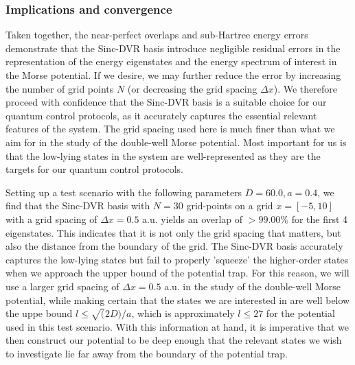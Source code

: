 \documentclass{subfiles}
\begin{document}
\subsubsection{Implications and convergence}
Taken together, the near-perfect overlaps and sub-Hartree energy errors demonstrate that the Sinc-DVR basis introduce negligible residual errors in the representation of the energy eigenstates and the energy spectrum of interest in the Morse potential. If we desire, we may further reduce the error by increasing the number of grid points $N$ (or decreasing the grid spacing $\Delta x$). We therefore proceed with confidence that the Sinc-DVR basis is a suitable choice for our quantum control protocols, as it accurately captures the essential relevant features of the system. The grid spacing used here is much finer than what we aim for in the study of the double-well Morse potential. Most important for us is that the low-lying states in the system are well-represented as they are the targets for our quantum control protocols. 

Setting up a test scenario with the following parameters $D = 60.0, a = 0.4$, we find that the Sinc-DVR basis with $N=30$ grid-points on a grid $x = [-5, 10]$ with a grid spacing of $\Delta x = 0.5$ a.u. yields an overlap of $>99.00\%$ for the first 4 eigenstates. This indicates that it is not only the grid spacing that matters, but also the distance from the boundary of the grid. The Sinc-DVR basis accurately captures the low-lying states but fail to properly 'squeeze' the higher-order states when we approach the upper bound of the potential trap. For this reason, we will use a larger grid spacing of $\Delta x = 0.5$ a.u. in the study of the double-well Morse potential, while making certain that the states we are interested in are well below the uppe bound $l \leq \sqrt(2D)/a$, which is approximately $l \leq 27$ for the potential used in this test scenario. With this information at hand, it is imperative that we then construct our potential to be deep enough that the relevant states we wish to investigate lie far away from the boundary of the potential trap.
\end{document}
